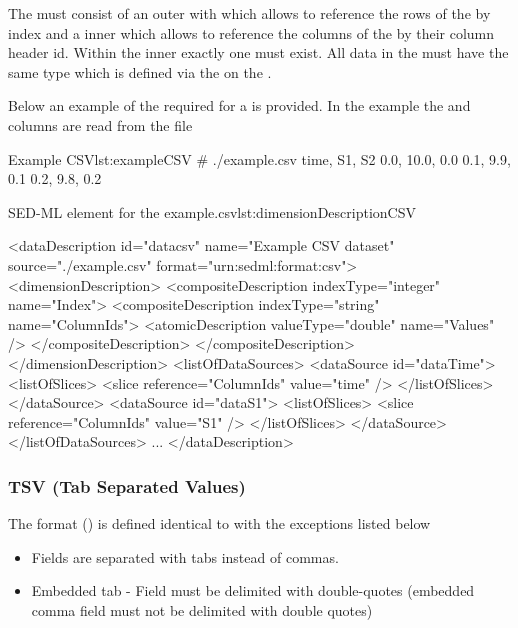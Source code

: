 The {} must consist of an outer  with  which allows to reference the rows of the  by index and a inner  which allows to reference the columns of the  by their column header id. Within the inner  exactly one  must exist. All data in the  must have the same type  which is defined via the  on the .

Below an example of the required \hyperref[sec:dimensionDescription]{} for a  is provided. In the example the  and  columns are read from the  file
\begin{myXmlLst}{Example CSV}{lst:exampleCSV}
# ./example.csv
time, S1, S2
0.0, 10.0, 0.0
0.1, 9.9, 0.1
0.2, 9.8, 0.2
\end{myXmlLst}

\begin{myXmlLst}{SED-ML  element for the example.csv}{lst:dimensionDescriptionCSV}

<dataDescription id="datacsv" name="Example CSV dataset" source="./example.csv" format="urn:sedml:format:csv">
  <dimensionDescription>
    <compositeDescription indexType="integer" name="Index">
      <compositeDescription indexType="string" name="ColumnIds">
        <atomicDescription valueType="double" name="Values" />
      </compositeDescription>
    </compositeDescription>
  </dimensionDescription>
  <listOfDataSources>
    <dataSource id="dataTime">
      <listOfSlices>
        <slice reference="ColumnIds" value="time" />
      </listOfSlices>
    </dataSource>
    <dataSource id="dataS1">
      <listOfSlices>
        <slice reference="ColumnIds" value="S1" />
      </listOfSlices>
    </dataSource>
  </listOfDataSources>
  ...          
</dataDescription>
\end{myXmlLst} 

\subsubsection{TSV (Tab Separated Values)}
\label{sec:dataFormatTSV}
The format  () is defined identical to \hyperref[sec:dataFormatCSV]{} with the exceptions listed below
\begin{itemize}
    \item Fields are separated with tabs instead of commas.
    \item Embedded tab - Field must be delimited with double-quotes (embedded comma field must not be delimited with double quotes)
\end{itemize}


